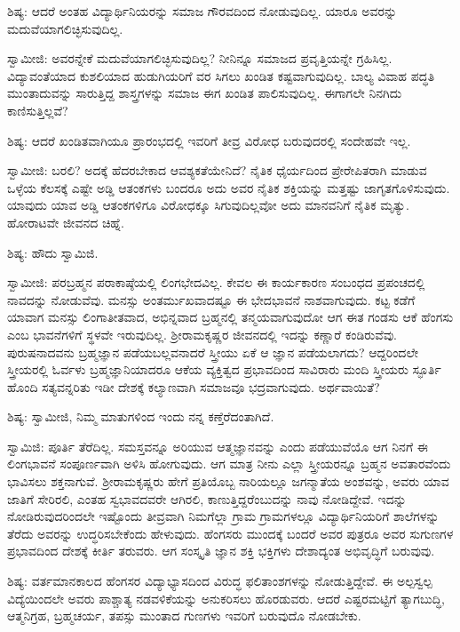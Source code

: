 ಶಿಷ್ಯ: ಆದರೆ ಅಂತಹ ವಿದ್ಯಾರ್ಥಿನಿಯರನ್ನು ಸಮಾಜ ಗೌರವದಿಂದ ನೋಡುವುದಿಲ್ಲ. ಯಾರೂ ಅವರನ್ನು ಮದುವೆಯಾಗಲಿಚ್ಛಿಸುವುದಿಲ್ಲ.

ಸ್ವಾಮೀಜಿ: ಅವರನ್ನೇಕೆ ಮದುವೆಯಾಗಲಿಚ್ಛಿಸುವುದಿಲ್ಲ? ನೀನಿನ್ನೂ ಸಮಾಜದ ಪ್ರವೃತ್ತಿಯನ್ನೇ ಗ್ರಹಿಸಿಲ್ಲ. ವಿದ್ಯಾವಂತೆಯಾದ ಕುಶಲಿಯಾದ ಹುಡುಗಿಯರಿಗೆ ವರ ಸಿಗಲು ಖಂಡಿತ ಕಷ್ಟವಾಗುವುದಿಲ್ಲ. ಬಾಲ್ಯ ವಿವಾಹ ಪದ್ಧತಿ ಮುಂತಾದುವನ್ನು ಸಾರುತ್ತಿದ್ದ ಶಾಸ್ತ್ರಗಳನ್ನು ಸಮಾಜ ಈಗ ಖಂಡಿತ ಪಾಲಿಸುವುದಿಲ್ಲ. ಈಗಾಗಲೇ ನಿನಗಿದು ಕಾಣಿಸುತ್ತಿಲ್ಲವೆ?

ಶಿಷ್ಯ: ಆದರೆ ಖಂಡಿತವಾಗಿಯೂ ಪ್ರಾರಂಭದಲ್ಲಿ ಇವರಿಗೆ ತೀವ್ರ ವಿರೋಧ ಬರುವುದರಲ್ಲಿ ಸಂದೇಹವೇ ಇಲ್ಲ.

ಸ್ವಾಮೀಜಿ: ಬರಲಿ? ಅದಕ್ಕೆ ಹೆದರಬೇಕಾದ ಆವಶ್ಯಕತೆಯೇನಿದೆ? ನೈತಿಕ ಧೈರ್ಯದಿಂದ ಪ್ರೇರೇಪಿತರಾಗಿ ಮಾಡುವ ಒಳ್ಳೆಯ ಕೆಲಸಕ್ಕೆ ಎಷ್ಟೇ ಅಡ್ಡಿ ಆತಂಕಗಳು ಬಂದರೂ ಅದು ಅವರ ನೈತಿಕ ಶಕ್ತಿಯನ್ನು ಮತ್ತಷ್ಟು ಜಾಗೃತಗೊಳಿಸುವುದು. ಯಾವುದು ಯಾವ ಅಡ್ಡಿ ಆತಂಕಗಳಿಗೂ ವಿರೋಧಕ್ಕೂ ಸಿಗುವುದಿಲ್ಲವೋ ಅದು ಮಾನವನಿಗೆ ನೈತಿಕ ಮೃತ್ಯು. ಹೋರಾಟವೇ ಜೀವನದ ಚಿಹ್ನೆ.

ಶಿಷ್ಯ: ಹೌದು ಸ್ವಾಮಿಜಿ.

ಸ್ವಾಮೀಜಿ: ಪರಬ್ರಹ್ಮನ ಪರಾಕಾಷ್ಠೆಯಲ್ಲಿ ಲಿಂಗಭೇದವಿಲ್ಲ. ಕೇವಲ ಈ ಕಾರ್ಯಕಾರಣ ಸಂಬಂಧದ ಪ್ರಪಂಚದಲ್ಲಿ ನಾವದನ್ನು ನೋಡುವೆವು. ಮನಸ್ಸು ಅಂತರ್ಮುಖವಾದಷ್ಟೂ ಈ ಭೇದಭಾವನೆ ನಾಶವಾಗುವುದು. ಕಟ್ಟ ಕಡೆಗೆ ಯಾವಾಗ ಮನಸ್ಸು ಲಿಂಗಾತೀತವಾದ, ಅಭಿನ್ನವಾದ ಬ್ರಹ್ಮನಲ್ಲಿ ತನ್ಮಯವಾಗುವುದೋ ಆಗ ಈತ ಗಂಡಸು ಆಕೆ ಹೆಂಗಸು ಎಂಬ ಭಾವನೆಗಳಿಗೆ ಸ್ಥಳವೇ ಇರುವುದಿಲ್ಲ. ಶ‍್ರೀರಾಮಕೃಷ್ಣರ ಜೀವನದಲ್ಲಿ ಇದನ್ನು ಕಣ್ಣಾರೆ ಕಂಡಿರುವೆವು. ಪುರುಷನಾದವನು ಬ್ರಹ್ಮಜ್ಞಾನ ಪಡೆಯಬಲ್ಲವನಾದರೆ ಸ್ತ್ರೀಯು ಏಕೆ ಆ ಜ್ಞಾನ ಪಡೆಯಲಾಗದು? ಆದ್ದರಿಂದಲೇ ಸ್ತ್ರೀಯರಲ್ಲಿ ಓರ್ವಳು ಬ್ರಹ್ಮಜ್ಞಾನಿಯಾದರೂ ಆಕೆಯ ವ್ಯಕ್ತಿತ್ವದ ಪ್ರಭಾವದಿಂದ ಸಾವಿರಾರು ಮಂದಿ ಸ್ತ್ರೀಯರು ಸ್ಫೂರ್ತಿ ಹೊಂದಿ ಸತ್ಯವನ್ನರಿತು ಇಡೀ ದೇಶಕ್ಕೆ ಕಲ್ಯಾಣವಾಗಿ ಸಮಾಜವೂ ಭದ್ರವಾಗುವುದು. ಅರ್ಥವಾಯಿತೆ?

ಶಿಷ್ಯ: ಸ್ವಾಮೀಜಿ, ನಿಮ್ಮ ಮಾತುಗಳಿಂದ ಇಂದು ನನ್ನ ಕಣ್ತೆರೆದಂತಾಗಿದೆ.

ಸ್ವಾಮಿಜಿ: ಪೂರ್ತಿ ತೆರೆದಿಲ್ಲ. ಸಮಸ್ತವನ್ನೂ ಅರಿಯುವ ಆತ್ಮಜ್ಞಾನವನ್ನು ಎಂದು ಪಡೆಯುವೆಯೊ ಆಗ ನಿನಗೆ ಈ ಲಿಂಗಭಾವನೆ ಸಂಪೂರ್ಣವಾಗಿ ಅಳಿಸಿ ಹೋಗುವುದು. ಆಗ ಮಾತ್ರ ನೀನು ಎಲ್ಲಾ ಸ್ತ್ರೀಯರನ್ನೂ ಬ್ರಹ್ಮನ ಅವತಾರವೆಂದು ಭಾವಿಸಲು ಶಕ್ತನಾಗುವೆ. ಶ‍್ರೀರಾಮಕೃಷ್ಣರು ಹೇಗೆ ಪ್ರತಿಯೊಬ್ಬ ನಾರಿಯಲ್ಲೂ ಜಗನ್ಮಾತೆಯ ಅಂಶವನ್ನು, ಅವರು ಯಾವ ಜಾತಿಗೆ ಸೇರಿರಲಿ, ಎಂತಹ ಸ್ವಭಾವದವರೇ ಆಗಿರಲಿ, ಕಾಣುತ್ತಿದ್ದರೆಂಬುದನ್ನು ನಾವು ನೋಡಿದ್ದೇವೆ. ಇದನ್ನು ನೋಡಿರುವುದರಿಂದಲೇ ಇಷ್ಟೊಂದು ತೀವ್ರವಾಗಿ ನಿಮಗೆಲ್ಲಾ ಗ್ರಾಮ ಗ್ರಾಮಗಳಲ್ಲೂ ವಿದ್ಯಾರ್ಥಿನಿಯರಿಗೆ ಶಾಲೆಗಳನ್ನು ತೆರೆದು ಅವರನ್ನು ಉದ್ಧರಿಸಬೇಕೆಂದು ಹೇಳುವುದು. ಹೆಂಗಸರು ಮುಂದಕ್ಕೆ ಬಂದರೆ ಅವರ ಪುತ್ರರೂ ಅವರ ಸುಗುಣಗಳ ಪ್ರಭಾವದಿಂದ ದೇಶಕ್ಕೆ ಕೀರ್ತಿ ತರುವರು. ಆಗ ಸಂಸ್ಕೃತಿ ಜ್ಞಾನ ಶಕ್ತಿ ಭಕ್ತಿಗಳು ದೇಶಾದ್ಯಂತ ಅಭಿವೃದ್ಧಿಗೆ ಬರುವುವು.

ಶಿಷ್ಯ: ವರ್ತಮಾನಕಾಲದ ಹೆಂಗಸರ ವಿದ್ಯಾಭ್ಯಾಸದಿಂದ ವಿರುದ್ಧ ಫಲಿತಾಂಶಗಳನ್ನು ನೋಡುತ್ತಿದ್ದೇವೆ. ಈ ಅಲ್ಪಸ್ವಲ್ಪ ವಿದ್ಯೆಯಿಂದಲೇ ಅವರು ಪಾಶ್ಚಾತ್ಯ ನಡವಳಿಕೆಯನ್ನು ಅನುಕರಿಸಲು ಹೊರಡುವರು. ಆದರೆ ಎಷ್ಟರಮಟ್ಟಿಗೆ ತ್ಯಾಗಬುದ್ಧಿ, ಆತ್ಮನಿಗ್ರಹ, ಬ್ರಹ್ಮಚರ್ಯ, ತಪಸ್ಸು ಮುಂತಾದ ಗುಣಗಳು ಇವರಿಗೆ ಬರುವುದೊ ನೋಡಬೇಕು.

